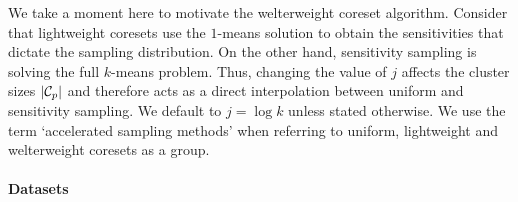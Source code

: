 We take a moment here to motivate the welterweight coreset algorithm.  Consider that lightweight coresets use the $1$-means solution to obtain the sensitivities
that dictate the sampling distribution. On the other hand, sensitivity sampling is solving the full $k$-means problem. Thus, changing the value of $j$ affects
the cluster sizes $|\mathcal C_p|$ and therefore acts as a direct interpolation between uniform and sensitivity sampling.  We default to $j = \log k$ unless stated
otherwise. We use the term `accelerated sampling methods' when referring to uniform, lightweight and welterweight coresets as a group.


\paragraph*{Datasets}
\label{sssec:datasets}

